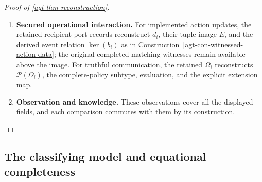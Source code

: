 \documentclass[11pt,a4paper]{article}
\numberwithin{equation}{section}
\theoremstyle{definition}
\theoremstyle{remark}
\theoremstyle{plain}
\providecommand{\kerpair}{\mathop{\mathrm{ker}}}
\providecommand{\pow}{\mathcal{P}}
\begin{document}
\begin{proof}[Proof of \cref{agt-thm-reconstruction}]
\begin{enumerate}[label=\textup{(\arabic*)},leftmargin=*,itemsep=4pt,topsep=3pt]
\emph{displayed} session type and endpoint policies reconstruct the two
pruned trees; their secured-matching synchronization reconstructs the
transcript witness. The witness is retained, not inferred from the
hidden scalar, and all off-path coordinates remain in the policy family.
  \item \textbf{Secured operational interaction.} For implemented action updates, the retained recipient-port records
reconstruct $d_i$, their tuple image $E$, and the derived event relation
$\kerpair(b_i)$ as in
Construction~\ref{agt-con-witnessed-action-data}; the original
completed matching witnesses remain available above the image. For truthful communication, the retained $\Omega_i$ reconstructs
$\pow(\Omega_i)$, the complete-policy subtype, evaluation, and the
explicit extension map.
  \item \textbf{Observation and knowledge.} These observations cover all the displayed fields, and each comparison
commutes with them by its construction.
\end{enumerate}
\end{proof}


\subsection{The classifying model and equational completeness}
\end{document}
